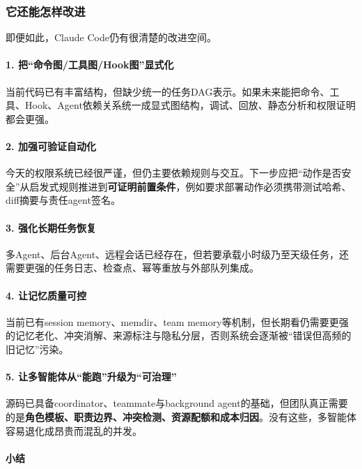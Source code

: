 \documentclass[12pt,a4paper]{article}
\begin{document}
\subsubsection{它还能怎样改进}

即便如此，Claude Code仍有很清楚的改进空间。

\paragraph{1. 把“命令图/工具图/Hook图”显式化}

当前代码已有丰富结构，但缺少统一的任务DAG表示。如果未来能把命令、工具、Hook、Agent依赖关系统一成显式图结构，调试、回放、静态分析和权限证明都会更强。

\paragraph{2. 加强可验证自动化}

今天的权限系统已经很严谨，但仍主要依赖规则与交互。下一步应把“动作是否安全”从启发式规则推进到\textbf{可证明前置条件}，例如要求部署动作必须携带测试哈希、diff摘要与责任agent签名。

\paragraph{3. 强化长期任务恢复}

多Agent、后台Agent、远程会话已经存在，但若要承载小时级乃至天级任务，还需要更强的任务日志、检查点、幂等重放与外部队列集成。

\paragraph{4. 让记忆质量可控}

当前已有session memory、memdir、team memory等机制，但长期看仍需要更强的记忆老化、冲突消解、来源标注与隐私分层，否则系统会逐渐被“错误但高频的旧记忆”污染。

\paragraph{5. 让多智能体从“能跑”升级为“可治理”}

源码已具备coordinator、teammate与background agent的基础，但团队真正需要的是\textbf{角色模板、职责边界、冲突检测、资源配额和成本归因}。没有这些，多智能体容易退化成昂贵而混乱的并发。

\paragraph{小结}
\end{document}
